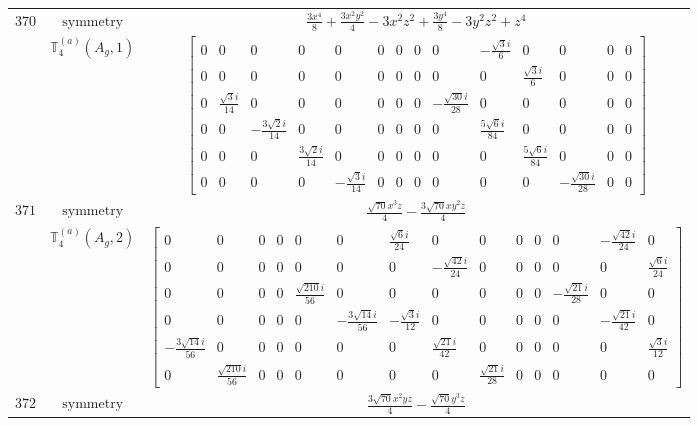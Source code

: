 \documentclass[fleqn,8pt,landscape]{jsarticle}
\begin{document}
\begin{longtable}{ccc}
$ 370 $ & $ \text{symmetry} $ & $ \frac{3 x^{4}}{8} + \frac{3 x^{2} y^{2}}{4} - 3 x^{2} z^{2} + \frac{3 y^{4}}{8} - 3 y^{2} z^{2} + z^{4} $ \\
$  $ & $ \mathbb{T}_{4}^{(a)}(A_{g},1) $ & $ \begin{bmatrix} 0 & 0 & 0 & 0 & 0 & 0 & 0 & 0 & 0 & - \frac{\sqrt{3} i}{6} & 0 & 0 & 0 & 0 \\ 0 & 0 & 0 & 0 & 0 & 0 & 0 & 0 & 0 & 0 & \frac{\sqrt{3} i}{6} & 0 & 0 & 0 \\ 0 & \frac{\sqrt{3} i}{14} & 0 & 0 & 0 & 0 & 0 & 0 & - \frac{\sqrt{30} i}{28} & 0 & 0 & 0 & 0 & 0 \\ 0 & 0 & - \frac{3 \sqrt{2} i}{14} & 0 & 0 & 0 & 0 & 0 & 0 & \frac{5 \sqrt{6} i}{84} & 0 & 0 & 0 & 0 \\ 0 & 0 & 0 & \frac{3 \sqrt{2} i}{14} & 0 & 0 & 0 & 0 & 0 & 0 & \frac{5 \sqrt{6} i}{84} & 0 & 0 & 0 \\ 0 & 0 & 0 & 0 & - \frac{\sqrt{3} i}{14} & 0 & 0 & 0 & 0 & 0 & 0 & - \frac{\sqrt{30} i}{28} & 0 & 0 \end{bmatrix} $ \\ \hline
$ 371 $ & $ \text{symmetry} $ & $ \frac{\sqrt{70} x^{3} z}{4} - \frac{3 \sqrt{70} x y^{2} z}{4} $ \\
$  $ & $ \mathbb{T}_{4}^{(a)}(A_{g},2) $ & $ \begin{bmatrix} 0 & 0 & 0 & 0 & 0 & 0 & \frac{\sqrt{6} i}{24} & 0 & 0 & 0 & 0 & 0 & - \frac{\sqrt{42} i}{24} & 0 \\ 0 & 0 & 0 & 0 & 0 & 0 & 0 & - \frac{\sqrt{42} i}{24} & 0 & 0 & 0 & 0 & 0 & \frac{\sqrt{6} i}{24} \\ 0 & 0 & 0 & 0 & \frac{\sqrt{210} i}{56} & 0 & 0 & 0 & 0 & 0 & 0 & - \frac{\sqrt{21} i}{28} & 0 & 0 \\ 0 & 0 & 0 & 0 & 0 & - \frac{3 \sqrt{14} i}{56} & - \frac{\sqrt{3} i}{12} & 0 & 0 & 0 & 0 & 0 & - \frac{\sqrt{21} i}{42} & 0 \\ - \frac{3 \sqrt{14} i}{56} & 0 & 0 & 0 & 0 & 0 & 0 & \frac{\sqrt{21} i}{42} & 0 & 0 & 0 & 0 & 0 & \frac{\sqrt{3} i}{12} \\ 0 & \frac{\sqrt{210} i}{56} & 0 & 0 & 0 & 0 & 0 & 0 & \frac{\sqrt{21} i}{28} & 0 & 0 & 0 & 0 & 0 \end{bmatrix} $ \\ \hline
$ 372 $ & $ \text{symmetry} $ & $ \frac{3 \sqrt{70} x^{2} y z}{4} - \frac{\sqrt{70} y^{3} z}{4} $ \\

\end{longtable}
\end{document}
